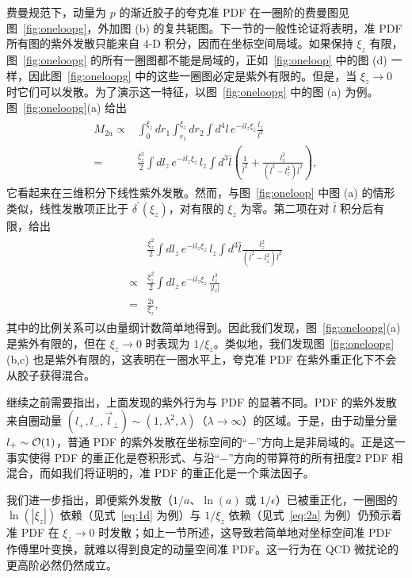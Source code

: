 费曼规范下，动量为 $p$ 的渐近胶子的夸克准 PDF 在一圈阶的费曼图见图~\ref{fig:oneloopg}，外加图 (b) 的复共轭图。下一节的一般性论证将表明，准 PDF 所有图的紫外发散只能来自 4-D 积分，因而在坐标空间局域。如果保持 $\xi_z$ 有限，图~\ref{fig:oneloopg} 的所有一圈图都不能是局域的，正如~\ref{fig:oneloop} 中的图 (d) 一样，因此图~\ref{fig:oneloopg} 中的这些一圈图必定是紫外有限的。但是，当 $\xi_z\to 0$ 时它们可以发散。为了演示这一特征，以图~\ref{fig:oneloopg} 中的图 (a) 为例。图~\ref{fig:oneloopg}(a) 给出
\begin{align}
\begin{split}\label{eq:2a0}
M_{2a}\propto& \int_0^{\xi_z} dr_1 \int_{r_1}^{\xi_z} dr_2 \int d^4l\, e^{-il_z \xi_z} \frac{l_z}{l^2} \\
=&\frac{\xi_z^2}{2}\int dl_z \, e^{-il_z \xi_z} \, l_z \int d^{3}\bar{l} \left( \frac{1}{\bar{l}^2}+ \frac{l_z^2}{(\bar{l}^2-l_z^2)\bar{l}^2}\right),
\end{split}
\end{align}
它看起来在三维积分下线性紫外发散。然而，与图~\ref{fig:oneloop} 中图 (a) 的情形类似，线性发散项正比于 $\delta^\prime(\xi_z)$，对有限的 $\xi_z$ 为零。第二项在对 $\bar{l}$ 积分后有限，给出
\begin{align}
\begin{split}\label{eq:2a}
& \frac{\xi_z^2}{2}\int dl_z \, e^{-il_z \xi_z} \, l_z \int d^{3}\bar{l} \frac{l_z^2}{(\bar{l}^2-l_z^2)\bar{l}^2}\\
\propto&\frac{\xi_z^2}{2}\int dl_z \, e^{-il_z \xi_z} \, \frac{l_z^3}{|l_z|}\\
=&\frac{2i}{\xi_z},
\end{split}
\end{align}
其中的比例关系可以由量纲计数简单地得到。因此我们发现，图~\ref{fig:oneloopg}(a) 是紫外有限的，但在 $\xi_z \to 0$ 时表现为 $1/\xi_z$。类似地，我们发现图~\ref{fig:oneloopg}(b,c) 也是紫外有限的，这表明在一圈水平上，夸克准 PDF 在紫外重正化下不会从胶子获得混合。


继续之前需要指出，上面发现的紫外行为与 PDF 的显著不同。PDF 的紫外发散来自圈动量 $(l_+, l_-, \vec{l}_\perp)\sim(1,\lambda^2,\lambda)$（$\lambda\to\infty$）的区域。于是，由于动量分量 $l_+\sim {\cal O}(1)$，普通 PDF 的紫外发散在坐标空间的``$-$''方向上是非局域的。正是这一事实使得 PDF 的重正化是卷积形式、与沿``$-$''方向的带算符的所有扭度2 PDF 相混合，而如我们将证明的，准 PDF 的重正化是一个乘法因子。

我们进一步指出，即便紫外发散（$1/a$、$\ln(a)$ 或 $1/\epsilon$）已被重正化，一圈图的 $\ln(|\xi_z|)$ 依赖（见式~\ref{eq:1d} 为例）与 $1/\xi_z$ 依赖（见式~\ref{eq:2a} 为例）仍预示着准 PDF 在 $\xi_z\to 0$ 时发散；如上一节所述，这导致若简单地对坐标空间准 PDF 作傅里叶变换，就难以得到良定的动量空间准 PDF。这一行为在 QCD 微扰论的更高阶必然仍然成立。
